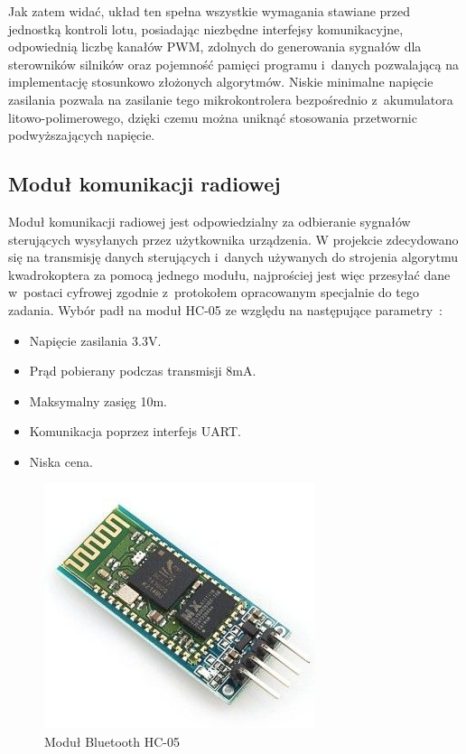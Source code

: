 Jak zatem widać, układ ten spełna wszystkie wymagania stawiane przed jednostką kontroli lotu, posiadając niezbędne interfejsy komunikacyjne, odpowiednią liczbę kanałów PWM, zdolnych do generowania sygnałów dla sterowników silników oraz pojemność pamięci programu i~danych pozwalającą na implementację stosunkowo złożonych algorytmów. Niskie minimalne napięcie zasilania pozwala na zasilanie tego mikrokontrolera bezpośrednio z~akumulatora litowo-polimerowego, dzięki czemu można uniknąć stosowania przetwornic podwyższających napięcie.

\subsection{Moduł komunikacji radiowej}
Moduł komunikacji radiowej jest odpowiedzialny za odbieranie sygnałów sterujących wysyłanych przez użytkownika urządzenia. W projekcie zdecydowano się na transmisję danych sterujących i~danych używanych do strojenia algorytmu kwadrokoptera za pomocą jednego modułu, najprościej jest więc przesyłać dane w~postaci cyfrowej zgodnie z~protokołem opracowanym specjalnie do tego zadania. Wybór padł na moduł HC-05 ze względu na następujące parametry~\cite{ds_hc05}:

\begin{itemize}
	\item Napięcie zasilania 3.3V.
	\item Prąd pobierany podczas transmisji 8mA.
	\item Maksymalny zasięg 10m.
	\item Komunikacja poprzez interfejs UART.
	\item Niska cena.
\end{itemize}

\begin{figure}[H]
	\centering
	\includegraphics[scale=0.7]{Pictures/HC-05.jpg}
		\caption[Moduł Bluetooth HC-05]{Moduł Bluetooth HC-05~\cite{ds_hc05}}
	\label{fig:hc-05}
\end{figure}


